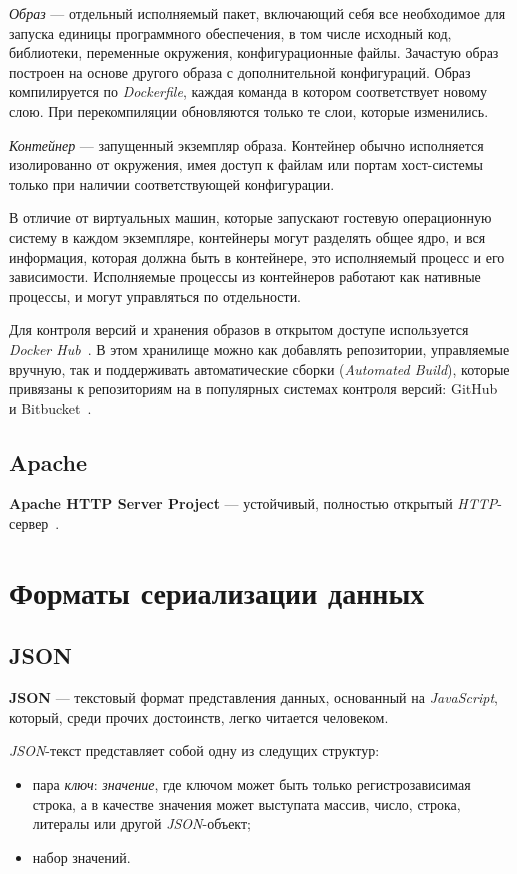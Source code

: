 \textit{Образ} --- отдельный исполняемый пакет, включающий себя все необходимое для запуска единицы программного обеспечения, в том числе исходный код, библиотеки, переменные окружения, конфигурационные файлы. Зачастую образ построен на основе другого образа с дополнительной конфигураций. Образ компилируется по \textit{Dockerfile}, каждая команда в котором соответствует новому слою. При перекомпиляции обновляются только те слои, которые изменились. 

\textit{Контейнер} --- запущенный экземпляр образа. Контейнер обычно исполняется изолированно от окружения, имея доступ к файлам или портам хост-системы только при наличии соответствующей конфигурации.

В отличие от виртуальных машин, которые запускают гостевую операционную систему в каждом экземпляре, контейнеры могут разделять общее ядро, и вся информация, которая должна быть в контейнере, это исполняемый процесс и его зависимости. Исполняемые процессы из контейнеров работают как нативные процессы, и могут управляться по отдельности. 

Для контроля версий и хранения образов в открытом доступе используется \emph{Docker Hub}~\cite{dhub}. В этом хранилище можно как добавлять репозитории, управляемые вручную, так и поддерживать автоматические сборки (\textit{Automated Build}), которые привязаны к репозиториям на в популярных системах контроля версий: GitHub~\cite{github} и Bitbucket~\cite{bitbucket}.
\subsection{Apache}
\textbf{Apache HTTP Server Project} --- устойчивый, полностью открытый \emph{HTTP}-сервер~\cite{apache}.

\section{Форматы сериализации данных}
\subsection{JSON}
\textbf{JSON} --- текстовый формат представления данных, основанный на \emph{JavaScript}, который, среди прочих достоинств, легко читается человеком.

\emph{JSON}-текст представляет собой одну из следущих структур:\begin{itemize}
\item пара \textit{ключ}: \textit{значение}, где ключом может быть только регистрозависимая строка, а в качестве значения может выступата массив, число, строка, литералы или другой \emph{JSON}-объект;
\item набор значений.
\end{itemize}

